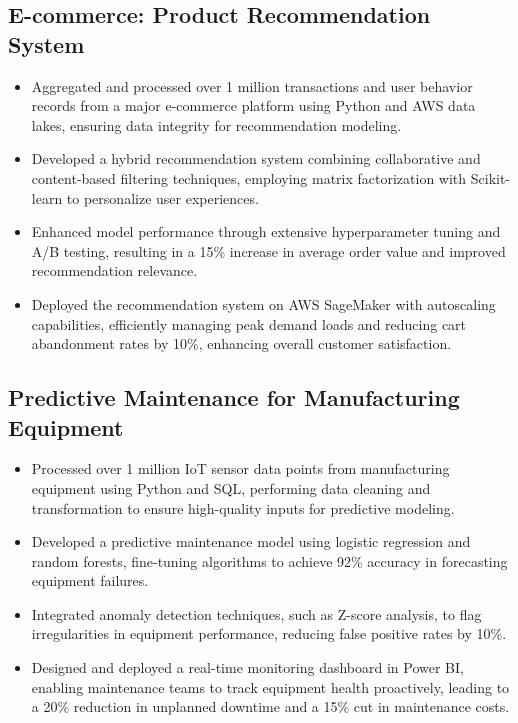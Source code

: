 \documentclass[12pt,a4paper]{article}
\begin{document}
\subsection*{E-commerce: Product Recommendation System}
\begin{itemize}[leftmargin=*,noitemsep,topsep=0pt]
\item Aggregated and processed over 1 million transactions and user behavior records from a major e-commerce platform using Python and AWS data lakes, ensuring data integrity for recommendation modeling.
\item Developed a hybrid recommendation system combining collaborative and content-based filtering techniques, employing matrix factorization with Scikit-learn to personalize user experiences.
\item Enhanced model performance through extensive hyperparameter tuning and A/B testing, resulting in a 15\% increase in average order value and improved recommendation relevance.
\item Deployed the recommendation system on AWS SageMaker with autoscaling capabilities, efficiently managing peak demand loads and reducing cart abandonment rates by 10\%, enhancing overall customer satisfaction.
\end{itemize}

\subsection*{Predictive Maintenance for Manufacturing Equipment}
\begin{itemize}[leftmargin=*,noitemsep,topsep=0pt]
\item Processed over 1 million IoT sensor data points from manufacturing equipment using Python and SQL, performing data cleaning and transformation to ensure high-quality inputs for predictive modeling.
\item Developed a predictive maintenance model using logistic regression and random forests, fine-tuning algorithms to achieve 92\% accuracy in forecasting equipment failures.
\item Integrated anomaly detection techniques, such as Z-score analysis, to flag irregularities in equipment performance, reducing false positive rates by 10\%.
\item Designed and deployed a real-time monitoring dashboard in Power BI, enabling maintenance teams to track equipment health proactively, leading to a 20\% reduction in unplanned downtime and a 15\% cut in maintenance costs.
\end{itemize}
\end{document}
